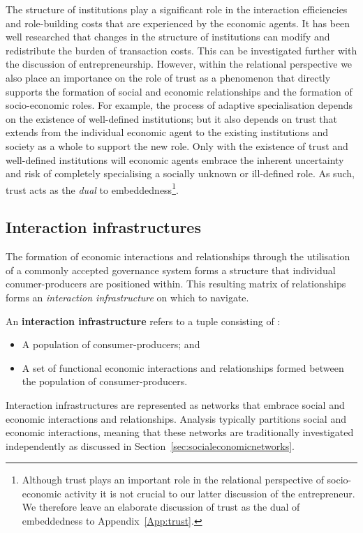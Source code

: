 \medskip \noindent The structure of institutions play a significant role in the interaction efficiencies and role-building costs that are experienced by the economic agents. It has been well researched that changes in the structure of institutions can modify and redistribute the burden of transaction costs. This can be investigated further with the discussion of entrepreneurship. However, within the relational perspective we also place an importance on the role of trust as a phenomenon that directly supports the formation of social and economic relationships and the formation of socio-economic roles. For example, the process of adaptive specialisation depends on the existence of well-defined institutions; but it also depends on trust that extends from the individual economic agent to the existing institutions and society as a whole to support the new role. Only with the existence of trust and well-defined institutions will economic agents embrace the inherent uncertainty and risk of completely specialising a socially unknown or ill-defined role. As such, trust acts as the \emph{dual} to embeddedness\footnote{Although trust plays an important role in the relational perspective of socio-economic activity it is not crucial to our latter discussion of the entrepreneur. We therefore leave an elaborate discussion of trust as the dual of embeddedness to Appendix~\ref{App:trust}.}.

\subsection{Interaction infrastructures}

The formation of economic interactions and relationships through the utilisation of a commonly accepted governance system forms a structure that individual conumer-producers are positioned within. This resulting matrix of relationships forms an \emph{interaction infrastructure} on which to navigate.
\begin{definition} \label{definition:interactionInfrastruture}
An \textbf{interaction infrastructure} refers to a tuple consisting of : 
\begin{itemize}
\item[(1)] A population of consumer-producers; and 
\item[(2)] A set of functional economic interactions and relationships formed between the population of consumer-producers.
\end{itemize}
\end{definition} 
Interaction infrastructures are represented as networks that embrace social and economic interactions and relationships. Analysis typically partitions social and economic interactions, meaning that these networks are traditionally investigated independently as discussed in Section~\ref{sec:socialeconomicnetworks}.

